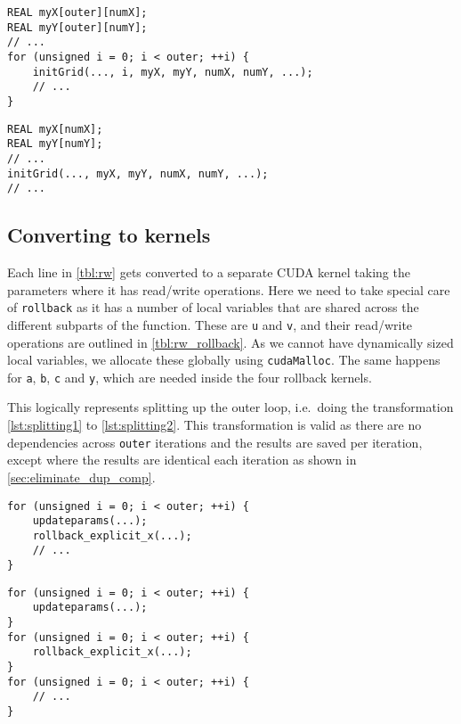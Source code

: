 \documentclass[a4paper]{article}
\begin{document}
\begin{lstlisting}[caption={Code doing duplicate computations.},label={lst:duplicate1}]
REAL myX[outer][numX];
REAL myY[outer][numY];
// ...
for (unsigned i = 0; i < outer; ++i) {
    initGrid(..., i, myX, myY, numX, numY, ...);
    // ...
}
\end{lstlisting}
\begin{lstlisting}[caption={Removal of duplicate computations.},label={lst:duplicate2}]
REAL myX[numX];
REAL myY[numY];
// ...
initGrid(..., myX, myY, numX, numY, ...);
// ...
\end{lstlisting}

\subsection{Converting to kernels}

Each line in \autoref{tbl:rw} gets converted to a separate CUDA kernel taking
the parameters where it has read/write operations. Here we need to take special
care of \texttt{rollback} as it has a number of local variables that are shared
across the different subparts of the function. These are \texttt{u} and
\texttt{v}, and their read/write operations are outlined in
\autoref{tbl:rw_rollback}. As we cannot have dynamically sized local variables,
we allocate these globally using \texttt{cudaMalloc}. The same happens for
\texttt{a}, \texttt{b}, \texttt{c} and \texttt{y}, which are needed inside the
four rollback kernels.

This logically represents splitting up the outer loop, i.e.\ doing the
transformation \autoref{lst:splitting1} to \autoref{lst:splitting2}. This
transformation is valid as there are no dependencies across \texttt{outer}
iterations and the results are saved per iteration, except where the results
are identical each iteration as shown in \autoref{sec:eliminate_dup_comp}.

\begin{lstlisting}[caption={Before splitting loops.},label={lst:splitting1}]
for (unsigned i = 0; i < outer; ++i) {
    updateparams(...);
    rollback_explicit_x(...);
    // ...
}
\end{lstlisting}
\begin{lstlisting}[caption={After splitting loops.},label={lst:splitting2}]
for (unsigned i = 0; i < outer; ++i) {
    updateparams(...);
}
for (unsigned i = 0; i < outer; ++i) {
    rollback_explicit_x(...);
}
for (unsigned i = 0; i < outer; ++i) {
    // ...
}
\end{lstlisting}
\end{document}

